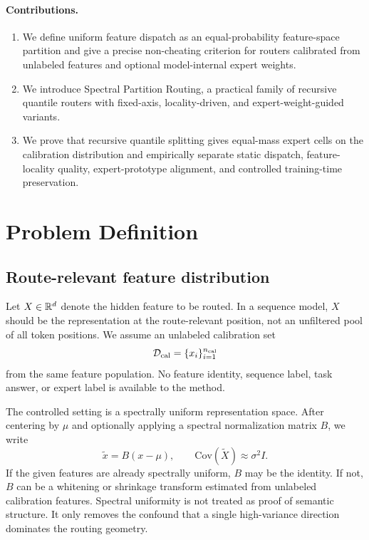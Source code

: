 \documentclass{article}
\begin{document}
\paragraph{Contributions.}
\begin{enumerate}
\item We define uniform feature dispatch as an equal-probability feature-space
partition and give a precise non-cheating criterion for routers calibrated from
unlabeled features and optional model-internal expert weights.
\item We introduce Spectral Partition Routing, a practical family of recursive
quantile routers with fixed-axis, locality-driven, and expert-weight-guided
variants.
\item We prove that recursive quantile splitting gives equal-mass expert cells on
the calibration distribution and empirically separate static dispatch,
feature-locality quality, expert-prototype alignment, and controlled
training-time preservation.
\end{enumerate}

\section{Problem Definition}

\subsection{Route-relevant feature distribution}

Let $X\in\mathbb{R}^d$ denote the hidden feature to be routed.  In a sequence model,
$X$ should be the representation at the route-relevant position, not an
unfiltered pool of all token positions.  We assume an unlabeled calibration set
\begin{equation}
\mathcal{D}_{\mathrm{cal}}=\{x_i\}_{i=1}^{n_{\mathrm{cal}}}
\end{equation}
from the same feature population.  No feature identity, sequence label, task
answer, or expert label is available to the method.

The controlled setting is a spectrally uniform representation space.  After
centering by $\mu$ and optionally applying a spectral normalization matrix $B$,
we write
\begin{equation}
  \tilde x = B(x-\mu),
  \qquad
  \mathrm{Cov}(\tilde X)\approx \sigma^2 I.
\end{equation}
If the given features are already spectrally uniform, $B$ may be the identity.
If not, $B$ can be a whitening or shrinkage transform estimated from unlabeled
calibration features.  Spectral uniformity is not treated as proof of semantic
structure.  It only removes the confound that a single high-variance direction
dominates the routing geometry.
\end{document}
